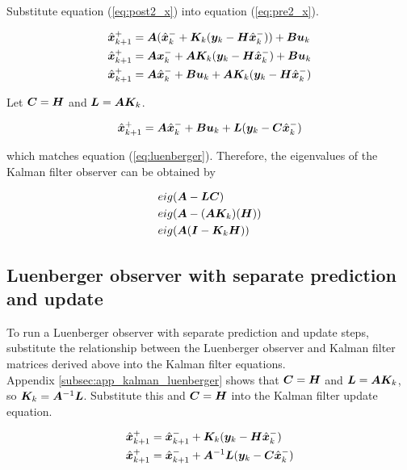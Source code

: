 Substitute equation (\ref{eq:post2_x}) into equation (\ref{eq:pre2_x}).

\begin{align*}
  \hat{\bm x}_{k+1}^+ &= \bm A(\hat{\bm x}_k^- + \bm K_k(\bm y_k -
    \bm H\hat{\bm x}_k^-)) + \bm B\bm u_k \\
  \hat{\bm x}_{k+1}^+ &= \bm A\bm x_k^- + \bm A\bm K_k(\bm y_k -
    \bm H\hat{\bm x}_k^-) + \bm B\bm u_k \\
  \hat{\bm x}_{k+1}^+ &= \bm A\hat{\bm x}_k^- + \bm B\bm u_k +
    \bm A\bm K_k(\bm y_k - \bm H\hat{\bm x}_k^-)
\end{align*}

Let $\bm C = \bm H$ and $\bm L = \bm A \bm K_k$.

\begin{equation} \label{eq:app_kalman_leunberger}
  \hat{\mtx{x}}_{k+1}^+ = \mtx{A}\hat{\mtx{x}}_k^- + \mtx{B}\mtx{u}_k + \mtx{L}
    (\mtx{y}_k - \mtx{C}\hat{\mtx{x}}_k^-)
\end{equation}

which matches equation (\ref{eq:luenberger}). Therefore, the eigenvalues of the
Kalman filter observer can be obtained by

\begin{align}
  &eig(\bm A - \bm L\bm C) \nonumber \\
  &eig(\bm A - (\bm A\bm K_k)(\bm H)) \nonumber \\
  &eig(\bm A(\bm I - \bm K_k\bm H))
\end{align}

\subsection{Luenberger observer with separate prediction and update}
\label{subsec:app_luenberger_separate}

To run a Luenberger observer with separate prediction and update steps,
substitute the relationship between the Luenberger observer and Kalman filter
matrices derived above into the Kalman filter equations. \\

Appendix \ref{subsec:app_kalman_luenberger} shows that $\bm C = \bm H$ and
$\bm L = \bm A\bm K_k$, so $\bm K_k = \bm A^{-1}\bm L$. Substitute
this and $\bm C = \bm H$ into the Kalman filter update equation.

\begin{align*}
  \hat{\bm x}_{k+1}^+ &= \hat{\bm x}_{k+1}^- + \bm K_k(\bm y_k -
    \bm H\hat{\bm x}_k^-) \\
  \hat{\bm x}_{k+1}^+ &= \hat{\bm x}_{k+1}^- + \bm A^{-1}\bm L
    (\bm y_k - \bm C\hat{\bm x}_k^-)
\end{align*}

